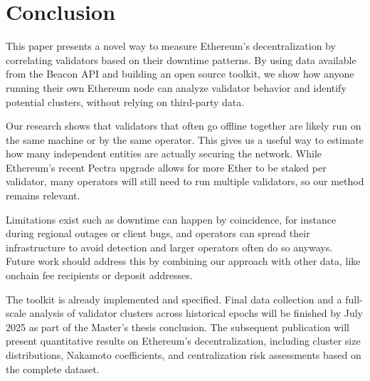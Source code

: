 \documentclass[runningheads]{llncs}
\begin{document}
\section{Conclusion}

This paper presents a novel way to measure Ethereum’s decentralization by correlating validators based on their downtime patterns. By using data available from the Beacon API and building an open source toolkit, we show how anyone running their own Ethereum node can analyze validator behavior and identify potential clusters, without relying on third-party data.

Our research shows that validators that often go offline together are likely run on the same machine or by the same operator. This gives us a useful way to estimate how many independent entities are actually securing the network. While Ethereum’s recent Pectra upgrade allows for more Ether to be staked per validator, many operators will still need to run multiple validators, so our method remains relevant.

Limitations exist such as downtime can happen by coincidence, for instance during regional outages or client bugs, and operators can spread their infrastructure to avoid detection and larger operators often do so anyways. Future work should address this by combining our approach with other data, like onchain fee recipients or deposit addresses.

The toolkit is already implemented and specified. Final data collection and a full-scale analysis of validator clusters across historical epochs will be finished by July 2025 as part of the Master’s thesis conclusion. The subsequent publication will present quantitative results on Ethereum’s decentralization, including cluster size distributions, Nakamoto coefficients, and centralization risk assessments based on the complete dataset.

\printbibliography
\end{document}

